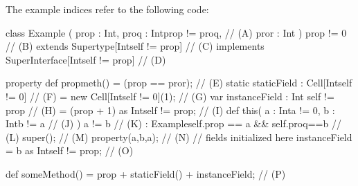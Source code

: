 The example indices refer to the following code:
\begin{xten}
class Example (
   prop : Int,
   proq : Int{prop != proq},                    // (A)
   pror : Int
   )
   {prop != 0}                                  // (B)
   extends Supertype[Int{self != prop}]         // (C)
   implements SuperInterface[Int{self != prop}] // (D)
{
   property def propmeth() = (prop == pror);    // (E)
   static staticField
      : Cell[Int{self != 0}]                    // (F)
      = new Cell[Int{self != 0}](1);            // (G)
   var instanceField
      : Int {self != prop}                      // (H)
      = (prop + 1) as Int{self != prop};        // (I)
   def this(
      a : Int{a != 0},
      b : Int{b != a}                           // (J)
      )
      {a != b}                                  // (K)
      : Example{self.prop == a && self.proq==b} // (L)
   {
      super();                                  // (M)
      property(a,b,a);                          // (N)
      // fields initialized here
      instanceField = b as Int{self != prop};   // (O)
   }

   def someMethod() =
        prop + staticField() + instanceField;   // (P)
}
\end{xten}
%
